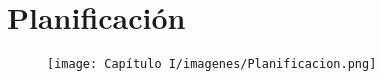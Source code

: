 
\section{Planificación}

	\begin{figure}
		\centering
		\texttt{[image: Capítulo I/imagenes/Planificacion.png]}\\
	\end{figure}